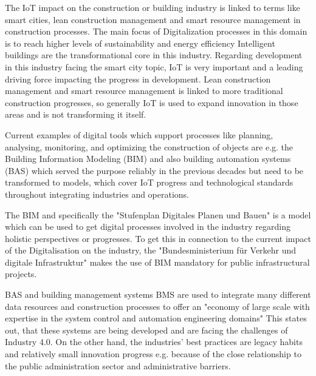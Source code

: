 The \ac{IoT} impact on the construction or building industry is linked to terms like smart cities, lean construction management and smart resource management in construction processes. The main focus of Digitalization processes in this domain is to reach higher levels of sustainability and energy efficiency %
Intelligent buildings are the transformational core in this industry. Regarding development in this industry facing the smart city topic, \ac{IoT} is very important and a leading driving force impacting the progress in development. Lean construction management and smart resource management is linked to more traditional construction progresses, so generally \ac{IoT} is used to expand innovation in those areas and is not transforming it itself.

Current examples of digital tools which support processes like planning, analysing, monitoring, and optimizing the construction of objects are e.g. the Building Information Modeling (\ac{BIM}) and also building automation systems (\ac{BAS}) which served the purpose reliably in the previous decades but need to be transformed to models, which cover \ac{IoT} progress and technological standards throughout integrating industries and operations. %

The \ac{BIM} and specifically the "Stufenplan Digitales Planen und Bauen" %
is a model which can be used to get digital processes involved in the industry regarding holistic perspectives or progresses. To get this in connection to the current impact of the \ac{Digitalisation} on the industry, the "Bundesministerium für Verkehr und digitale Infrastruktur" makes the use of BIM mandatory for public infrastructural projects. %

\ac{BAS} and building management systems \ac{BMS} are used to integrate many different data resources and construction processes to offer an "economy of large scale with expertise in the system control and automation engineering domains" %
This states out, that these systems are being developed and are facing the challenges of Industry 4.0. On the other hand, the industries' best practices are legacy habits and relatively small innovation progress e.g. because of the close relationship to the public administration sector and administrative barriers.

